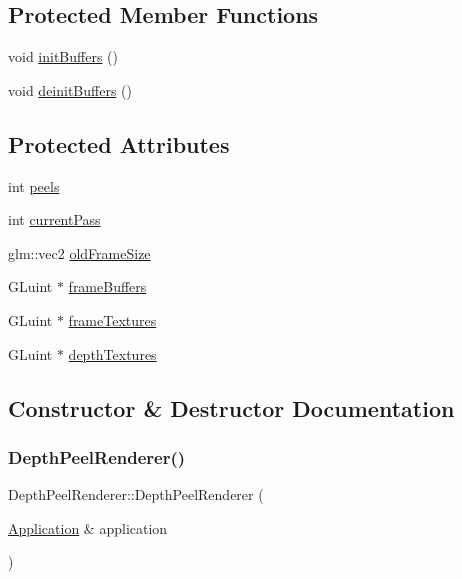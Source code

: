 \subsection*{Protected Member Functions}
\begin{DoxyCompactItemize}
\item 
void \mbox{\hyperlink{classsage_1_1DepthPeelRenderer_aa2d91f10ea251ceb3b8566f713fd4086}{init\+Buffers}} ()
\item 
void \mbox{\hyperlink{classsage_1_1DepthPeelRenderer_a0b598e6d6cd9d14a21184cf895aca441}{deinit\+Buffers}} ()
\end{DoxyCompactItemize}
\subsection*{Protected Attributes}
\begin{DoxyCompactItemize}
\item 
int \mbox{\hyperlink{classsage_1_1DepthPeelRenderer_a4ffb28eb6faffc06f3ef8cb3c6882484}{peels}}
\item 
int \mbox{\hyperlink{classsage_1_1DepthPeelRenderer_a974d2de89e4efa233179d04071ad01a8}{current\+Pass}}
\item 
glm\+::vec2 \mbox{\hyperlink{classsage_1_1DepthPeelRenderer_a13ffd76ace4de9e39acc01a4a25634cf}{old\+Frame\+Size}}
\item 
G\+Luint $\ast$ \mbox{\hyperlink{classsage_1_1DepthPeelRenderer_ab68cb59974bf2e40f61693ee03a99475}{frame\+Buffers}}
\item 
G\+Luint $\ast$ \mbox{\hyperlink{classsage_1_1DepthPeelRenderer_adf53903d948d4d5e2290cf1baa8148ea}{frame\+Textures}}
\item 
G\+Luint $\ast$ \mbox{\hyperlink{classsage_1_1DepthPeelRenderer_a053e3c6a03a0038208b30d88848e1a95}{depth\+Textures}}
\end{DoxyCompactItemize}


\subsection{Constructor \& Destructor Documentation}
\mbox{\label{classsage_1_1DepthPeelRenderer_aabc19f8da49637f4c10035ffb32910f1}} 
\subsubsection{\texorpdfstring{DepthPeelRenderer()}{DepthPeelRenderer()}\hspace{0.1cm}{\footnotesize\ttfamily [1/2]}}
{\footnotesize\ttfamily Depth\+Peel\+Renderer\+::\+Depth\+Peel\+Renderer (\begin{DoxyParamCaption}\item[{\mbox{\hyperlink{classsage_1_1Application}{Application}} \&}]{application }\end{DoxyParamCaption})}

